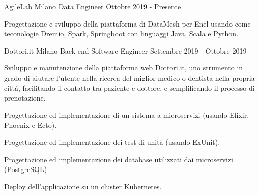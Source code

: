 \documentclass{resume} %
\begin{document}



\cvEntry
  {AgileLab}
  {Milano}
  {Data Engineer}
  {Ottobre 2019 - Presente}{
    \begin{cvEntryItems}
      \item Progettazione e sviluppo della piattaforma di DataMesh per Enel usando come
            teconologie Dremio, Spark, Springboot con linguaggi Java, Scala e Python.
    \end{cvEntryItems}
}


\cvEntry
  {Dottori.it}
  {Milano}
  {Back-end Software Engineer}
  {Settembre 2019 - Ottobre 2019}{
    \begin{cvEntryItems}
      \item Sviluppo e manutenzione della piattaforma web Dottori.it, uno strumento in grado
            di aiutare l'utente nella ricerca del miglior medico o dentista nella propria
            citt\`a, facilitando il contatto tra paziente e dottore, e semplificando il
            processo di prenotazione.
      \item Progettazione ed implementazione di un sistema a microservizi (usando Elixir,
            Phoenix e Ecto).
      \item Progettazione ed implementazione dei test di unit\`a (usando ExUnit).
      \item Progettazione ed implementazione dei database utilizzati dai microservizi (PostgreSQL)
      \item Deploy dell'applicazione su un cluster Kubernetes.
    \end{cvEntryItems}
}

\end{document}
